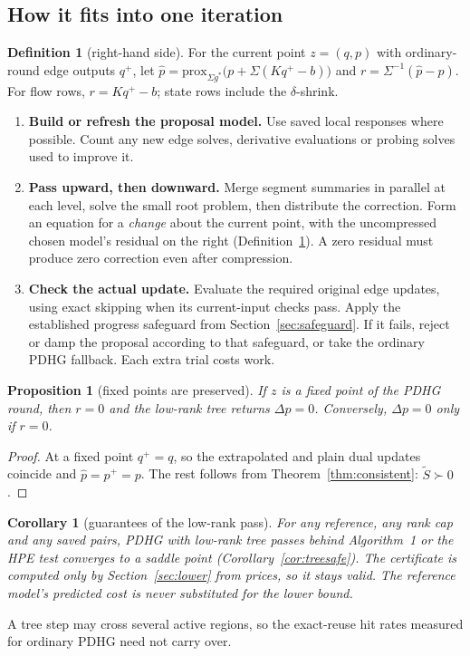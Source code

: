 \documentclass[11pt]{article}
\theoremstyle{plain}
\newtheorem{proposition}[theorem]{Proposition}
\newtheorem{corollary}[theorem]{Corollary}
\theoremstyle{definition}
\newtheorem{definition}[theorem]{Definition}
\theoremstyle{remark}
\begin{document}
\subsection{How it fits into one iteration}
\begin{definition}[right-hand side]\label{def:rhs}
For the current point $z=(q,p)$ with ordinary-round edge outputs $q^+$, let $\hat p=\mathrm{prox}_{\Sigma g^*}\big(p+\Sigma(Kq^+-b)\big)$ and $r=\Sigma^{-1}(\hat p-p)$. For flow rows, $r=Kq^+-b$; state rows include the $\delta$-shrink.
\end{definition}
\begin{enumerate}[leftmargin=1.4em]
  \item \textbf{Build or refresh the proposal model.} Use saved local responses where possible. Count any new edge solves, derivative evaluations or probing solves used to improve it.
  \item \textbf{Pass upward, then downward.} Merge segment summaries in parallel at each level, solve the small root problem, then distribute the correction. Form an equation for a \emph{change} about the current point, with the uncompressed chosen model's residual on the right (Definition~\ref{def:rhs}). A zero residual must produce zero correction even after compression.
  \item \textbf{Check the actual update.} Evaluate the required original edge updates, using exact skipping when its current-input checks pass. Apply the established progress safeguard from Section~\ref{sec:safeguard}. If it fails, reject or damp the proposal according to that safeguard, or take the ordinary PDHG fallback. Each extra trial costs work.
\end{enumerate}

\begin{proposition}[fixed points are preserved]\label{prop:fixed}
If $z$ is a fixed point of the PDHG round, then $r=0$ and the low-rank tree returns $\Delta p=0$. Conversely, $\Delta p=0$ only if $r=0$.
\end{proposition}
\begin{proof}
At a fixed point $q^+=q$, so the extrapolated and plain dual updates coincide and $\hat p=p^+=p$. The rest follows from Theorem~\ref{thm:consistent}: $\tilde S\succ0$.
\end{proof}

\begin{corollary}[guarantees of the low-rank pass]\label{cor:lowrank}
For any reference, any rank cap and any saved pairs, PDHG with low-rank tree passes behind Algorithm~1 or the HPE test converges to a saddle point (Corollary~\ref{cor:treesafe}). The certificate is computed only by Section~\ref{sec:lower} from prices, so it stays valid. The reference model's predicted cost is never substituted for the lower bound.
\end{corollary}
A tree step may cross several active regions, so the exact-reuse hit rates measured for ordinary PDHG need not carry over.
\end{document}

